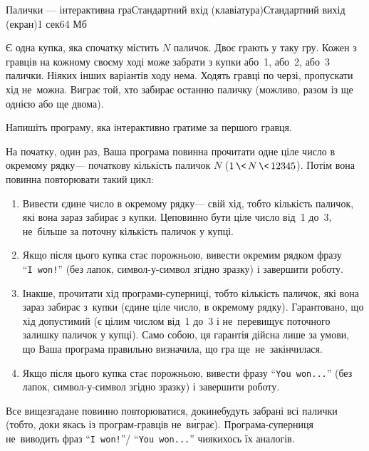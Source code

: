 \begin{problem}{Палички --- інтерактивна гра}{Стандартний вхід (клавіатура)}{Стандартний вихід (екран)}{1 сек}{64 Мб}\label{text:sticks-simple-begin}
\label{prob:201819-oioi-C-sticks-simple-interactive}

Є одна купка, яка спочатку містить $N$ паличок.
Двоє грають у таку гру.
Кожен з гравців на кожному своєму ході може забрати з купки або~1, або~2, або~3 палички.
Ніяких інших варіантів ходу нема. 
Ходять гравці по черзі, пропускати хід не~можна.
Виграє той, хто забирає останню паличку (можливо, разом із ще однією або ще двома).

Напишіть програму, яка інтерактивно гратиме за першого гравця. 

На початку, один раз, Ваша програма повинна прочитати одне ціле число в окремому рядку\nolinebreak[3] --- початкову кількість паличок $N$ (${1\,{\<}\,N\,{\<}\,12345}$).
Потім вона повинна повторювати такий цикл:
\begin{enumerate}
\item
Вивести єдине число в окремому рядку\nolinebreak[3] --- свій хід, тобто кількість паличок, які вона зараз забирає з купки.
Це\nolinebreak[3] повинно бути ціле число від~1 до~3, %
не~більше за поточну кількість паличок у купці. 
\item
Якщо після цього купка стає порожньою, 
вивести окремим рядком фразу ``\texttt{I~won!}''
(без лапок, символ-у-символ згідно зразку) і завершити роботу.
\item
Інакше, прочитати хід програми-суперниці, тобто кількість паличок, які вона зараз забирає з~купки (єдине ціле число, в окремому рядку).
Гарантовано, що хід допустимий (є цілим числом від~1 до~3 і не~перевищує поточного залишку паличок у купці).
Само собою, ця гарантія дійсна лише за умови, що Ваша програма правильно визначила, що гра ще~не~закінчилася.
\item
Якщо після цього купка стає порожньою, 
вивести %
фразу ``\texttt{You~won...}''
(без лапок, символ-у-символ згідно зразку) і завершити роботу.
\end{enumerate}
Все вищезгадане повинно повторюватися, доки\nolinebreak[3] не\nolinebreak[2] будуть забрані всі палички (тобто, доки якась із програм-гравців не~в\'{и}грає).
Програма-суперниця не~виводить фраз ``\texttt{I~won!}''\nolinebreak[3] / ``\texttt{You~won...}'' 
чи\nolinebreak[2] якихось їх аналогів.


\end{problem}
